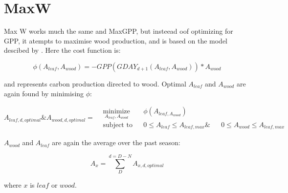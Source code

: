 \section{MaxW}
Max W works much the same and MaxGPP, but insteead oof optimizing for GPP, it atempts to maximise wood production, and is based on the model descibed by  \citep{McMurtrie2013}. Here the cost function is:

\begin{equation}
	\phi(A_{leaf},A_{wood}) = - GPP (GDAY_{d+1}(A_{leaf},A_{wood})) * A_{wood}
\end{equation}

and represents carbon production directed to wood. Optimal $A_{leaf}$ and $A_{wood}$ are again found by minimising $\phi$:

\begin{equation*}
A_{leaf,d,optimal} \text{\&} A_{wood,d,optimal}=
\begin{aligned}
& \underset{A_{leaf}, A_{wood}}{\text{minimize}}
& & \phi(A_{leaf,A_{wood}}) \\
& \text{subject to}
& & 0 \leq A_{leaf} \leq A_{leaf,max} \&
& & 0 \leq A_{wood} \leq A_{leaf,max}
\end{aligned}
\end{equation*}

 $A_{wood}$ and $A_{leaf}$ are again the average over the past season:

\begin{equation}
	A_{x}= \sum_{D}^{d=D-N} A_{x,d,optimal}
\end{equation}

where $x$ is $leaf$ or $wood$.
